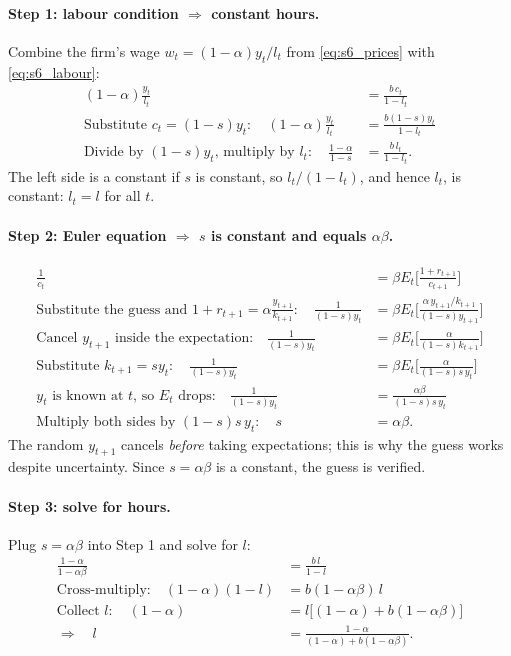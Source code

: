 \paragraph{Step 1: labour condition $\Rightarrow$ constant hours.} Combine the firm's wage $w_t=(1-\alpha)y_t/l_t$ from \eqref{eq:s6_prices} with \eqref{eq:s6_labour}:
\begin{align*}
(1-\alpha)\frac{y_t}{l_t}&=\frac{b\,c_t}{1-l_t}\\
\text{Substitute }c_t=(1-s)y_t:\quad (1-\alpha)\frac{y_t}{l_t}&=\frac{b(1-s)y_t}{1-l_t}\\
\text{Divide by }(1-s)y_t\text{, multiply by }l_t:\quad \frac{1-\alpha}{1-s}&=\frac{b\,l_t}{1-l_t}.
\end{align*}
The left side is a constant if $s$ is constant, so $l_t/(1-l_t)$, and hence $l_t$, is constant: $l_t=l$ for all $t$.

\paragraph{Step 2: Euler equation $\Rightarrow$ $s$ is constant and equals $\alpha\beta$.}
\begin{align*}
\frac1{c_t}&=\beta E_t\Big[\frac{1+r_{t+1}}{c_{t+1}}\Big]\\
\text{Substitute the guess and }1+r_{t+1}=\alpha\tfrac{y_{t+1}}{k_{t+1}}:\quad
\frac1{(1-s)y_t}&=\beta E_t\Big[\frac{\alpha\,y_{t+1}/k_{t+1}}{(1-s)y_{t+1}}\Big]\\
\text{Cancel }y_{t+1}\text{ inside the expectation:}\quad
\frac1{(1-s)y_t}&=\beta E_t\Big[\frac{\alpha}{(1-s)k_{t+1}}\Big]\\
\text{Substitute }k_{t+1}=sy_t:\quad
\frac1{(1-s)y_t}&=\beta E_t\Big[\frac{\alpha}{(1-s)s\,y_t}\Big]\\
y_t\text{ is known at }t\text{, so }E_t\text{ drops:}\quad
\frac1{(1-s)y_t}&=\frac{\alpha\beta}{(1-s)s\,y_t}\\
\text{Multiply both sides by }(1-s)s\,y_t:\quad s&=\alpha\beta .
\end{align*}
The random $y_{t+1}$ cancels \emph{before} taking expectations; this is why the guess works despite uncertainty. Since $s=\alpha\beta$ is a constant, the guess is verified.

\paragraph{Step 3: solve for hours.} Plug $s=\alpha\beta$ into Step 1 and solve for $l$:
\begin{align*}
\frac{1-\alpha}{1-\alpha\beta}&=\frac{b\,l}{1-l}\\
\text{Cross-multiply:}\quad (1-\alpha)(1-l)&=b(1-\alpha\beta)\,l\\
\text{Collect }l:\quad (1-\alpha)&=l\big[(1-\alpha)+b(1-\alpha\beta)\big]\\
\Rightarrow\quad l&=\frac{1-\alpha}{(1-\alpha)+b(1-\alpha\beta)} .
\end{align*}

